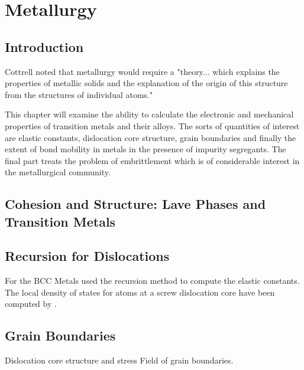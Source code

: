 \chapter{Metallurgy}

\section{Introduction}
  Cottrell noted that metallurgy would require a "theory... which explains
the properties of metallic solids and the explanation of the origin of this
structure from the structures of individual atoms." 

This chapter will examine the ability to calculate the electronic and mechanical
properties of transition metals and their alloys. The sorts of quantities
of interest are elastic constants, dislocation core structure, grain boundaries
and finally the extent of bond mobility in metals in the presence of impurity
segregants. The final part treats the problem of embrittlement which is of considerable
interest in the metallurgical community.

\section{Cohesion and Structure: Lave Phases and Transition Metals}

\section{Recursion for Dislocations}
For the BCC Metals \cite{terakura84} used the recursion method to compute the elastic constants.
The local density of states for atoms at a screw dislocation core have been computed by \cite{paidar81}. 

\section{Grain Boundaries}
Dislocation core structure and stress Field of grain boundaries.

